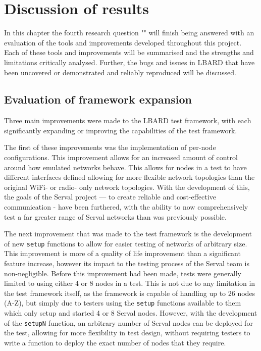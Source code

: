 
\chapter{Discussion of results} %

\label{Chapter7} %

In this chapter the fourth research question "\fourthRQ" will finish being answered with an evaluation of the tools and improvements developed throughout this project.
Each of these tools and improvements will be summarised and the strengths and limitations critically analysed.
Further, the bugs and issues in LBARD that have been uncovered or demonstrated and reliably reproduced will be discussed.

\section{Evaluation of framework expansion}
Three main improvements were made to the LBARD test framework, with each significantly expanding or improving the capabilities of the test framework.

The first of these improvements was the implementation of per-node configurations.
This improvement allows for an increased amount of control around how emulated networks behave.
This allows for nodes in a test to have different interfaces defined allowing for more flexible network topologies than the original WiFi- or radio- only network topologies.
With the development of this, the goals of the Serval project — to create reliable and cost-effective communication - have been furthered, with the ability to now comprehensively test a far greater range of Serval networks than was previously possible.

The next improvement that was made to the test framework is the development of new \texttt{setup} functions to allow for easier testing of networks of arbitrary size.
This improvement is more of a quality of life improvement than a significant feature increase, however its impact to the testing process of the Serval team is non-negligible.
Before this improvement had been made, tests were generally limited to using either 4 or 8 nodes in a test. 
This is not due to any limitation in the test framework itself, as the framework is capable of handling up to 26 nodes (A-Z), but simply due to testers using the \texttt{setup} functions available to them which only setup and started 4 or 8 Serval nodes.
However, with the development of the \texttt{setupN} function, an arbitrary number of Serval nodes can be deployed for the test, allowing for more flexibility in test design, without requiring testers to write a function to deploy the exact number of nodes that they require.


